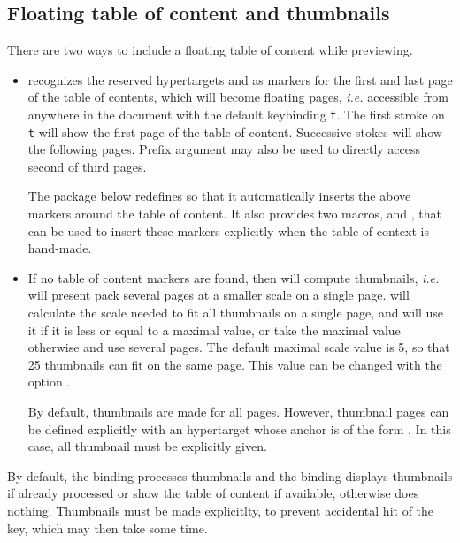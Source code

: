 \documentclass[12pt]{article}
\begin{document}
\subsection {Floating table of content and thumbnails}

There are two ways to include a floating table of content while previewing. 
\begin {itemize}

\item
{\ActiveDVI} recognizes the reserved hypertargets 
and  as markers for the first and last page of the table
of contents, which will become floating pages, {\em i.e.} accessible from
anywhere in the document with the default keybinding \verb't'.
The first stroke on \verb't' will show the first page of the table of
content. Successive stokes will show the following pages. Prefix argument 
may also be used to directly access second of third pages. 

The package  below redefines
{\docdef \tableofcontents} so that it automatically inserts the above
markers around the table of content. It also provides two macros, {\docdef
\advitoc} and \docdef \endadvitoc, that can be used to insert these markers
explicitly when the table of context is hand-made.

\item
If no table of content markers are found, then {\ActiveDVI} will
compute thumbnails, {\em i.e.} will present pack several pages at a smaller 
scale on a single page. {\ActiveDVI} will calculate the scale needed to 
fit all thumbnails on a single page, and will use it if it is 
less or equal to a maximal value, or take the maximal value otherwise
and use several pages. The default maximal scale value is 5, so that
25 thumbnails can fit on the same page. This value can be changed with the
option .  

By default, thumbnails are made for all pages. However, thumbnail pages can
be defined explicitly with an hypertarget whose anchor is of the form
. In this case, all thumbnail must be explicitly
given.

\end {itemize}
By default, the binding  processes thumbnails and the binding
  displays thumbnails if already processed or show the table of
content if available, otherwise does nothing. Thumbnails must be made
explicitlty, to prevent accidental hit of the key, which may then 
take some time.
\end{document}
